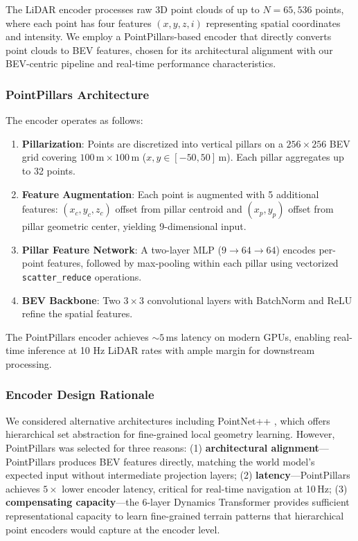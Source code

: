 \documentclass[journal]{IEEEtran}
\begin{document}
The LiDAR encoder processes raw 3D point clouds of up to $N = 65{,}536$ points, where each point has four features $(x, y, z, i)$ representing spatial coordinates and intensity. We employ a PointPillars-based encoder \cite{lang2019} that directly converts point clouds to BEV features, chosen for its architectural alignment with our BEV-centric pipeline and real-time performance characteristics.

\subsubsection{PointPillars Architecture}
The encoder operates as follows:

\begin{enumerate}
    \item \textbf{Pillarization}: Points are discretized into vertical pillars on a $256 \times 256$ BEV grid covering $100\,\text{m} \times 100\,\text{m}$ ($x, y \in [-50, 50]$\,m). Each pillar aggregates up to 32 points.
    \item \textbf{Feature Augmentation}: Each point is augmented with 5 additional features: $(x_c, y_c, z_c)$ offset from pillar centroid and $(x_p, y_p)$ offset from pillar geometric center, yielding 9-dimensional input.
    \item \textbf{Pillar Feature Network}: A two-layer MLP ($9 \rightarrow 64 \rightarrow 64$) encodes per-point features, followed by max-pooling within each pillar using vectorized \texttt{scatter\_reduce} operations.
    \item \textbf{BEV Backbone}: Two $3 \times 3$ convolutional layers with BatchNorm and ReLU refine the spatial features.
\end{enumerate}

The PointPillars encoder achieves ${\sim}5$\,ms latency on modern GPUs, enabling real-time inference at 10 Hz LiDAR rates with ample margin for downstream processing.

\subsubsection{Encoder Design Rationale}
We considered alternative architectures including PointNet++ \cite{qi2017b}, which offers hierarchical set abstraction for fine-grained local geometry learning. However, PointPillars was selected for three reasons: (1) \textbf{architectural alignment}---PointPillars produces BEV features directly, matching the world model's expected input without intermediate projection layers; (2) \textbf{latency}---PointPillars achieves $5\times$ lower encoder latency, critical for real-time navigation at 10\,Hz; (3) \textbf{compensating capacity}---the 6-layer Dynamics Transformer provides sufficient representational capacity to learn fine-grained terrain patterns that hierarchical point encoders would capture at the encoder level.
\end{document}
